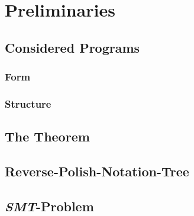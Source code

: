 \chapter{Preliminaries}


\section{Considered Programs}

\subsection{Form}

\subsection{Structure}

\section{The Theorem}

\section{Reverse-Polish-Notation-Tree}

\section{\emph{SMT}-Problem}
